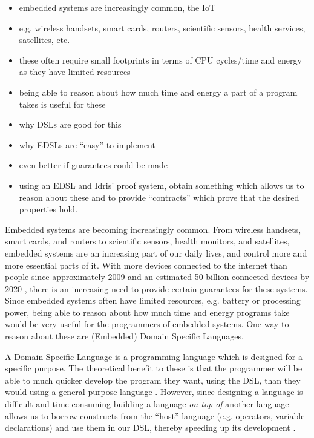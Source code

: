 \begin{itemize}
	\item embedded systems are increasingly common, the IoT
	\item e.g. wireless handsets, smart cards, routers, scientific sensors,
		  health services, satellites, etc.
	\item these often require small footprints in terms of CPU cycles/time and
		  energy as they have limited resources
	\item being able to reason about how much time and energy a part of a
		  program takes is useful for these
	\item why DSLs are good for this \cite{685738,hudak1996building}
	\item why EDSLs are ``easy'' to implement \cite{685738}
	\item even better if guarantees could be made
	\item using an EDSL and Idris' proof system, obtain something which allows
		  us to reason about these and to provide ``contracts'' which prove that
		  the desired properties hold.
\end{itemize}

Embedded systems are becoming increasingly common. From wireless handsets, smart cards, and routers to scientific sensors, health monitors, and satellites, embedded systems are an increasing part of our daily lives, and control more and more essential parts of it. With more devices connected to the internet than people since approximately 2009 and an estimated 50 billion connected devices by 2020 \cite{cisco-whitepaper}, there is an increasing need to provide certain guarantees for these systems. Since embedded systems often have limited resources, e.g. battery or processing power, being able to reason about how much time and energy programs take would be very useful for the programmers of embedded systems. One way to reason about these are (Embedded) Domain Specific Languages.\\\par

A Domain Specific Language is a programming language which is designed for a specific purpose. The theoretical benefit to these is that the programmer will be able to much quicker develop the program they want, using the DSL, than they would using a general purpose language \cite{685738}. However, since designing a language is difficult and time-consuming building a language \textit{on top of} another language allows us to borrow constructs from the ``host'' language (e.g. operators, variable declarations) and use them in our DSL, thereby speeding up its development \cite{hudak1996building}.\\\par

